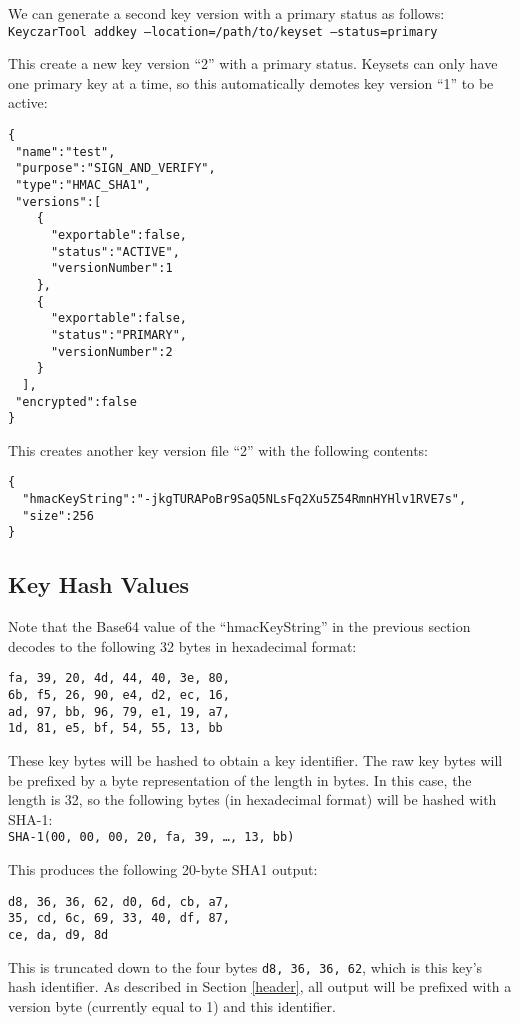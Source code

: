 \documentclass{llncs}
\begin{document}
We can generate a second key version with a primary status as follows: \\
{\tt KeyczarTool addkey --location=/path/to/keyset --status=primary}

This create a new key version ``2'' with a primary status. Keysets can only have
one primary key at a time, so this automatically demotes key version ``1'' to
be active:
\begin{verbatim}
{
 "name":"test",
 "purpose":"SIGN_AND_VERIFY",
 "type":"HMAC_SHA1",
 "versions":[
    {
      "exportable":false,
      "status":"ACTIVE",
      "versionNumber":1
    },
    {
      "exportable":false,
      "status":"PRIMARY",
      "versionNumber":2
    }
  ],
 "encrypted":false
}
\end{verbatim}

This creates another key version file ``2'' with the following contents:
\begin{verbatim}
{
  "hmacKeyString":"-jkgTURAPoBr9SaQ5NLsFq2Xu5Z54RmnHYHlv1RVE7s",
  "size":256
}
\end{verbatim}

\subsection{Key Hash Values}

Note that the Base64 value of the ``hmacKeyString'' in the previous
section decodes to the following 32 bytes in hexadecimal format:
\begin{verbatim}
fa, 39, 20, 4d, 44, 40, 3e, 80,
6b, f5, 26, 90, e4, d2, ec, 16,
ad, 97, bb, 96, 79, e1, 19, a7,
1d, 81, e5, bf, 54, 55, 13, bb
\end{verbatim}

These key bytes will be hashed to obtain a key identifier. The raw key bytes
will be prefixed by a byte representation of the length in bytes. In this case,
the length is 32, so the following bytes (in hexadecimal format) will be
hashed with SHA-1:\\ {\tt  SHA-1(00, 00, 00, 20, fa, 39, \ldots, 13, bb)}

This produces the following 20-byte SHA1 output:
\begin{verbatim}
d8, 36, 36, 62, d0, 6d, cb, a7,
35, cd, 6c, 69, 33, 40, df, 87,
ce, da, d9, 8d
\end{verbatim}

This is truncated down to the four bytes {\tt d8, 36, 36, 62}, which is
this key's hash identifier. As described in Section \ref{header}, all output
will be prefixed with a version byte (currently equal to 1) and this identifier.
\end{document}

